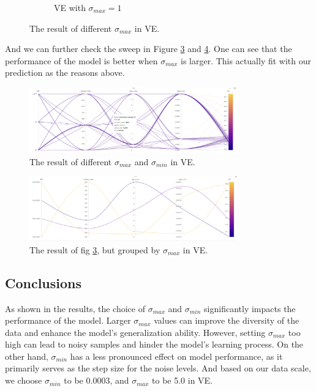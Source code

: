 \begin{figure}[htbp]
\begin{subfigure}[b]{0.4\textwidth}
        \caption{VE with $\sigma_{max} = 1$}
        \label{fig:ve_1}
    \end{subfigure}
    
    \caption{The result of different $\sigma_{max}$ in VE.}
    \label{fig:ve_sigma_max}
\end{figure}


And we can further check the sweep in Figure \ref{fig:sde_sweep} and \ref{fig:sde_sweep_sigmamax}. One can see that the performance of the model is better when $\sigma_{max}$ is larger. This actually fit with our prediction as the reasons above. 

\begin{figure}[h!]
    \centering
    \includegraphics[width=0.8\textwidth]{Figures/sde_sweep.png}
    \caption{The result of different $\sigma_{max}$ and $\sigma_{min}$ in VE.} \label{fig:sde_sweep}
\end{figure}

\begin{figure}
    \centering
    \includegraphics[width=0.8\textwidth]{Figures/sde_sweep_sigmamax.png} 
    \caption{The result of fig \ref{fig:sde_sweep}, but grouped by $\sigma_{max}$ in VE.}\label{fig:sde_sweep_sigmamax}
\end{figure}

\subsection{Conclusions}

As shown in the results, the choice of $\sigma_{max}$ and $\sigma_{min}$ significantly impacts the performance of the model. Larger $\sigma_{max}$ values can improve the diversity of the data and enhance the model's generalization ability. However, setting $\sigma_{max}$ too high can lead to noisy samples and hinder the model's learning process. On the other hand, $\sigma_{min}$ has a less pronounced effect on model performance, as it primarily serves as the step size for the noise levels. And based on our data scale, we choose $\sigma_{min}$ to be 0.0003, and $\sigma_{max}$ to be 5.0 in VE.

